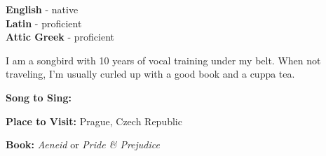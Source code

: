 \begin{minipage}[t]{0.2\textwidth}
	\vspace{-\baselineskip} %

	
	\textbf{English} - native\\
	\textbf{Latin} - proficient\\
	\textbf{Attic Greek} - proficient
\end{minipage}
\hfill
\begin{minipage}[t]{0.35\textwidth}
	\vspace{-\baselineskip} %
	
	
	I am a songbird with 10 years of vocal training under my belt. When not traveling, I'm usually curled up with a good book and a cuppa tea. 
\end{minipage}
\hfill
\begin{minipage}[t]{0.35\textwidth}
	\vspace{-\baselineskip} %
	
	
	\textbf{Song to Sing:} 
	
	\textbf{Place to Visit:} Prague, Czech Republic
	
	\textbf{Book:} \textit{Aeneid} or \textit{Pride \& Prejudice}
\end{minipage}